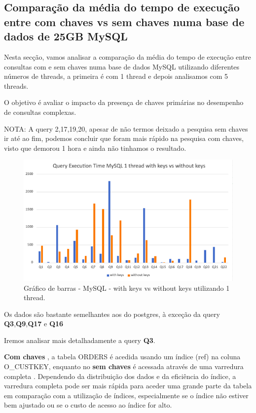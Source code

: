 \documentclass{article}
\begin{document}
\subsection{Comparação da média do tempo de execução entre com chaves vs sem chaves numa base de dados de 25GB MySQL}

\texttt{}\par Nesta secção, vamos analisar a comparação da média do tempo de execução entre consultas com e sem chaves numa base de dados MySQL utilizando diferentes números de threads, a primeira é com 1 thread e depois analisamos com 5 threads.

O objetivo é avaliar o impacto da presença de chaves primárias no desempenho de consultas complexas.

NOTA: A query 2,17,19,20, apesar de não termos deixado a pesquisa sem chaves ir até ao fim, podemos concluir que foram mais rápido na pesquisa com chaves, visto que demorou 1 hora e ainda não tinhamos o resultado.


\begin{figure}[H]
  \centering
  \includegraphics[width=\textwidth]{Graphs/mysqlonethread_withkeysvswithoutkeys.png}
  \caption{Gráfico de barras - MySQL - with keys vs without keys utilizando 1 thread.} 
  \label{fig:PKCreation2}
\end{figure}
Os dados são bastante semelhantes aos do postgres, à exceção da query \textbf{Q3},\textbf{Q9},\textbf{Q17} e \textbf{Q16}

Iremos analisar mais detalhadamente a query \textbf{Q3}.

\textbf{Com chaves} ,  a tabela ORDERS é acedida usando um índice (ref) na coluna O\_CUSTKEY, enquanto no \textbf{sem chaves} é acessada através de uma varredura completa . Dependendo da distribuição dos dados e da eficiência do índice, a varredura completa pode ser mais rápida para aceder uma grande parte da tabela em comparação com a utilização de índices, especialmente se o índice não estiver bem ajustado ou se o custo de acesso ao índice for alto.
\end{document}
